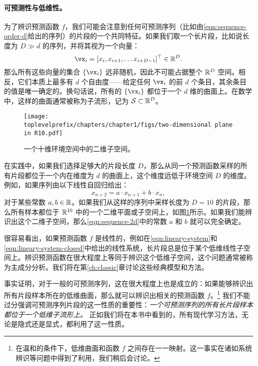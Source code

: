 \documentclass[../../book-main_zh.tex]{subfiles}
\begin{document}
\paragraph{可预测性与低维性。}
为了辨识预测函数 $f$，我们可能会注意到任何可预测序列（比如由\eqref{eqn:sequence-order-d}给出的序列）的片段的一个共同特征。如果我们取一个长片段，比如说长度为 $D \gg d$ 的序列，并将其视为一个向量：
\begin{equation}
    \vx_i = [x_i, x_{i+1}, \ldots x_{i+D-1}]^\top \in \mathbb{R}^D.
\end{equation}
那么所有这些向量的集合 $\{\vx_i\}$ 远非随机，因此不可能占据整个 $\mathbb{R}^D$ 空间。相反，它们本质上最多有 $d$ 个自由度——给定任何 $\vx_i$ 的前 $d$ 个条目，其余条目的值是唯一确定的。换句话说，所有的 $\{\vx_i\}$ 都位于一个 $d$ 维的曲面上。在数学中，这样的曲面通常被称为子流形，记为 $\mathcal{S} \subset \mathbb{R}^D$。


\begin{figure}[t]
\centering
\texttt{[image: \\toplevelprefix/chapters/chapter1/figs/two-dimensional plane in R10.pdf]}
    \caption{一个十维环境空间中的二维子空间。}
    \label{fig:lowdimplane}
\end{figure}
在实践中，如果我们选择足够大的片段长度 $D$，那么从同一个预测函数采样的所有片段都位于一个内在维度为 $d$ 的曲面上，这个维度远低于环境空间 $D$ 的维度。例如，如果序列由以下线性自回归给出：
\begin{equation}
    x_{n+2} = a\cdot x_{n+1} + b\cdot x_n,
    \label{eqn:sequence-2d}
\end{equation}
对于某些常数 $a, b \in \mathbb{R}$。如果我们从这样的序列中采样长度为 $D=10$ 的片段，那么所有样本都位于 $\mathbb{R}^{10}$ 中的一个二维平面或子空间上，如图\ref{fig:lowdimplane}所示。如果我们能辨识出这个二维子空间，那么\eqref{eqn:sequence-2d}中的常数 $a$ 和 $b$ 就可以完全确定。


很容易看出，如果预测函数 $f$ 是线性的，例如在\eqref{eqn:lineary-system}和\eqref{eqn:lineary-system-closed}中给出的线性系统，长片段总是位于某个低维线性子空间上。辨识预测函数在很大程度上等同于辨识这个低维子空间，这个问题通常被称为主成分分析。我们将在第\ref{ch:classic}章讨论这些经典模型和方法。

事实证明，对于一般的可预测序列，这在很大程度上也是成立的：如果能够辨识出所有片段样本所在的低维曲面，那么就可以辨识出相关的预测函数 $f$。\footnote{在温和的条件下，低维曲面和函数 $f$ 之间存在一一映射。这一事实在诸如系统辨识等问题中得到了利用，我们稍后会讨论。} 我们不能过分强调可预测序列片段的这一性质的重要性：{\em 一个可预测序列的所有长片段样本都位于一个低维子流形上。} 正如我们将在本书中看到的，所有现代学习方法，无论是隐式还是显式，都利用了这一性质。%
\end{document}
